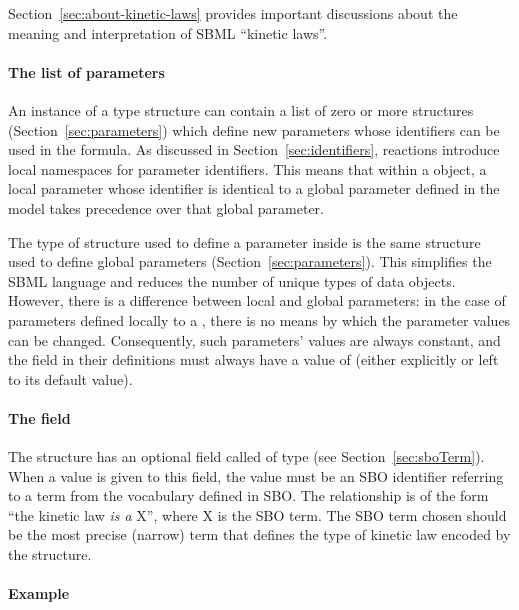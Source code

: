 Section~\ref{sec:about-kinetic-laws} provides important
discussions about the meaning and interpretation of SBML ``kinetic
laws''.


\paragraph{The list of parameters}

An instance of a \KineticLaw type structure can contain a list of
zero or more \Parameter structures (Section~\ref{sec:parameters})
which define new parameters whose identifiers can be used in the
 formula.  As discussed in
Section~\ref{sec:identifiers}, reactions introduce local
namespaces for parameter identifiers.  This means that within a
\KineticLaw object, a local parameter whose identifier is
identical to a global parameter defined in the model takes
precedence over that global parameter.

The type of structure used to define a parameter inside
\KineticLaw is the same \Parameter structure used to define global
parameters (Section~\ref{sec:parameters}).  This simplifies the
SBML language and reduces the number of unique types of data
objects.  However, there is a difference between local and global
parameters: in the case of parameters defined locally to a
\KineticLaw, there is no means by which the parameter values can
be changed.  Consequently, such parameters' values are always
constant, and the  field in their definitions must
always have a value of  (either explicitly or left to
its default value).


\paragraph{The  field}

The \KineticLaw structure has an optional field called
 of type  (see
Section~\ref{sec:sboTerm}).  When a value is given to this field,
the value must be an SBO identifier referring to a term from the
\sboratelaw vocabulary defined in SBO.  The relationship is of the
form ``the kinetic law \emph{is a} X'', where X is the SBO term.
The SBO term chosen should be the most precise (narrow) term that
defines the type of kinetic law encoded by the structure.


\paragraph{Example}

